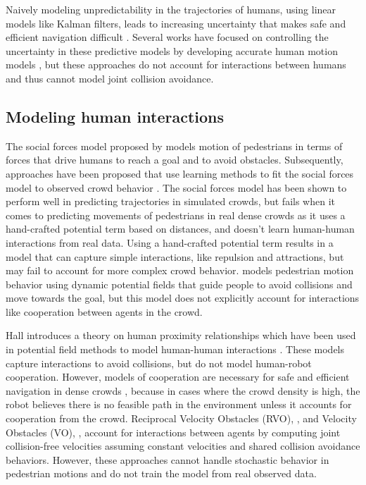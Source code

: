 Naively modeling unpredictability in the trajectories of humans, using linear models like Kalman filters, leads to increasing uncertainty that makes safe and efficient navigation difficult \cite{trautman10}. Several works have focused on controlling the uncertainty in these predictive models by developing accurate human motion models \cite{thompson09, bennewitz05}, but these approaches do not account for interactions between humans and thus cannot model joint collision avoidance. 

\subsection{Modeling human interactions}
\label{sec:oigp-inter-betw-humans}

The social forces model proposed by \cite{helbing95} models motion of pedestrians in terms of forces that drive humans to reach a goal and to avoid obstacles. Subsequently, approaches have been proposed that use learning methods to fit the social forces model to observed crowd behavior \cite{helbing09, johansson07}. The social forces model has been shown to perform well in predicting trajectories in simulated crowds, but fails when it comes to predicting movements of pedestrians in real dense crowds as it uses a hand-crafted potential term based on distances, and doesn't learn human-human interactions from real data. Using a hand-crafted potential term results in a model that can capture simple interactions, like repulsion and attractions, but may fail to account for more complex crowd behavior. \cite{adrien06} models pedestrian motion behavior using dynamic potential fields that guide people to avoid collisions and move towards the goal, but this model does not explicitly account for interactions like cooperation between agents in the crowd.

Hall \cite{hall63} introduces a theory on human proximity relationships which have been used in potential field methods to model human-human interactions \cite{svenstrup10, pradhan11}.
These models capture interactions to avoid collisions, but do not model human-robot cooperation. However,  models of cooperation are necessary for safe and efficient navigation in dense crowds \cite{trautman10}, because in cases where the crowd density is high, the robot believes there is no 
%
feasible
path in the environment unless it accounts for cooperation from the crowd. Reciprocal Velocity Obstacles (RVO), \cite{van2008reciprocal}, and Velocity Obstacles (VO), \cite{fiorini98}, account for interactions between agents by computing joint collision-free velocities assuming constant velocities and shared collision avoidance behaviors. However, these approaches cannot handle stochastic behavior in pedestrian motions and do not train the model from real observed data. 

